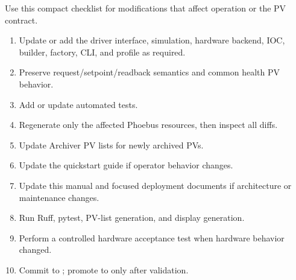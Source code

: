 Use this compact checklist for modifications that affect operation or the PV contract.

\begin{enumerate}
  \item Update or add the driver interface, simulation, hardware backend, IOC, builder, factory, CLI, and profile as required.
  \item Preserve request/setpoint/readback semantics and common health PV behavior.
  \item Add or update automated tests.
  \item Regenerate only the affected Phoebus resources, then inspect all diffs.
  \item Update Archiver PV lists for newly archived PVs.
  \item Update the quickstart guide if operator behavior changes.
  \item Update this manual and focused deployment documents if architecture or maintenance changes.
  \item Run Ruff, pytest, PV-list generation, and display generation.
  \item Perform a controlled hardware acceptance test when hardware behavior changed.
  \item Commit to ; promote to  only after validation.
\end{enumerate}
